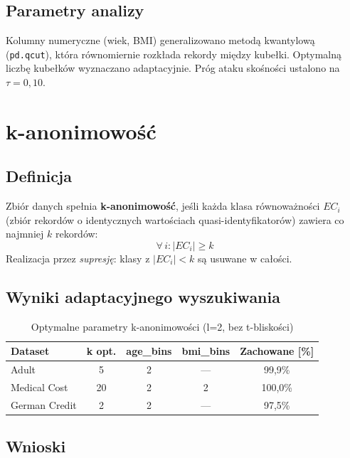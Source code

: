 \documentclass[12pt,a4paper]{article}
\begin{document}
\subsection{Parametry analizy}

Kolumny numeryczne (wiek, BMI) generalizowano metodą kwantylową
(\texttt{pd.qcut}), która równomiernie rozkłada rekordy między kubełki.
Optymalną liczbę kubełków wyznaczano adaptacyjnie.
Próg ataku skośności ustalono na $\tau = 0{,}10$.

\section{k-anonimowość}

\subsection{Definicja}

Zbiór danych spełnia \textbf{k-anonimowość}, jeśli każda klasa równoważności
$EC_i$ (zbiór rekordów o identycznych wartościach quasi-identyfikatorów)
zawiera co najmniej $k$ rekordów:
\[
    \forall\, i \colon |EC_i| \geq k
\]
Realizacja przez \emph{supresję}: klasy z $|EC_i| < k$ są usuwane w całości.

\subsection{Wyniki adaptacyjnego wyszukiwania}

\begin{table}[H]
\centering
\caption{Optymalne parametry k-anonimowości (l=2, bez t-bliskości)}
\begin{tabular}{lcccc}
\toprule
\textbf{Dataset} & \textbf{k opt.} & \textbf{age\_bins} & \textbf{bmi\_bins} & \textbf{Zachowane [\%]} \\
\midrule
Adult         & 5  & 2 & ---  & 99{,}9\% \\
Medical Cost  & 20 & 2 & 2    & 100{,}0\% \\
German Credit & 2  & 2 & ---  & 97{,}5\% \\
\bottomrule
\end{tabular}
\end{table}

\subsection{Wnioski}
\end{document}

